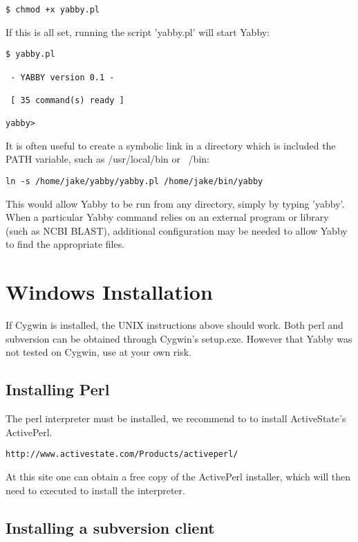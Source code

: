 \begin{verbatim}
$ chmod +x yabby.pl
\end{verbatim}

If this is all set, running the script 'yabby.pl' will start Yabby:

\begin{verbatim}
$ yabby.pl

 - YABBY version 0.1 - 

 [ 35 command(s) ready ]

yabby>
\end{verbatim}

It is often useful to create a symbolic link in a directory which
is included the PATH variable, such as /usr/local/bin or ~/bin:

\begin{verbatim}
ln -s /home/jake/yabby/yabby.pl /home/jake/bin/yabby
\end{verbatim}

This would allow Yabby to be run from any directory, simply by
typing 'yabby'. When a particular Yabby command relies on an 
external program or library (such as NCBI BLAST), additional
configuration may be needed to allow Yabby to find the appropriate
files.

\section{Windows Installation}

If Cygwin is installed, the UNIX instructions above should work. Both
perl and subversion can be obtained through Cygwin's setup.exe. However 
that Yabby was not tested on Cygwin, use at your own risk.

\subsection{Installing Perl}

The perl interpreter must be installed, we recommend to to install
ActiveState's ActivePerl.

\begin{verbatim}
http://www.activestate.com/Products/activeperl/
\end{verbatim}

At this site one can obtain a free copy of the ActivePerl installer, which
will then need to executed to install the interpreter.

\subsection{Installing a subversion client}

